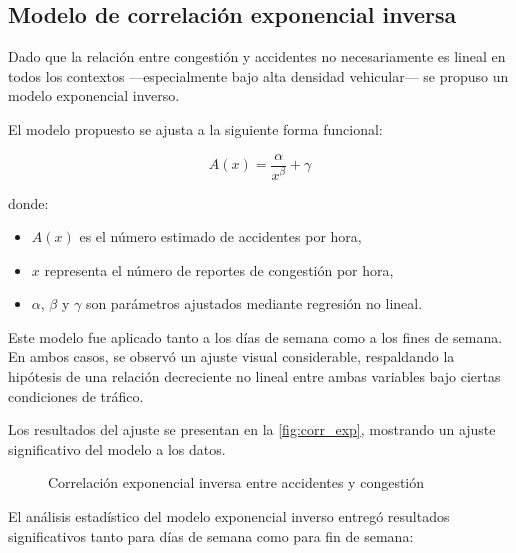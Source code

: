 \documentclass[12pt]{article}
\begin{document}
\subsection{Modelo de correlación exponencial inversa}

Dado que la relación entre congestión y accidentes no necesariamente es lineal en todos los contextos —especialmente bajo alta densidad vehicular— se propuso un modelo exponencial inverso.

El modelo propuesto se ajusta a la siguiente forma funcional:

\begin{equation}
A(x) = \frac{\alpha}{x^{\beta}} + \gamma
\end{equation}

donde:
\begin{itemize}
    \item $A(x)$ es el número estimado de accidentes por hora,
    \item $x$ representa el número de reportes de congestión por hora,
    \item $\alpha$, $\beta$ y $\gamma$ son parámetros ajustados mediante regresión no lineal.
\end{itemize}

Este modelo fue aplicado tanto a los días de semana como a los fines de semana. En ambos casos, se observó un ajuste visual considerable, respaldando la hipótesis de una relación decreciente no lineal entre ambas variables bajo ciertas condiciones de tráfico.

Los resultados del ajuste se presentan en la \autoref{fig:corr_exp}, mostrando un ajuste significativo del modelo a los datos.

\begin{figure}[H]
    \centering
    \newline
    \newline
    \caption{Correlación exponencial inversa entre accidentes y congestión}
    \label{fig:corr_exp}
\end{figure}

El análisis estadístico del modelo exponencial inverso entregó resultados significativos tanto para días de semana como para fin de semana:
\end{document}
